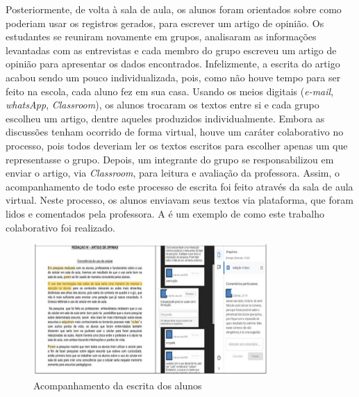 \documentclass{textolivre}
\begin{document}
Posteriormente, de volta à sala de aula, os alunos foram orientados sobre como poderiam usar os registros gerados, para escrever um artigo de opinião. Os estudantes se reuniram novamente em grupos, analisaram as informações levantadas com as entrevistas e cada membro do grupo escreveu um artigo de opinião para apresentar os dados encontrados. Infelizmente, a escrita do artigo acabou sendo um pouco individualizada, pois, como não houve tempo para ser feito na escola, cada aluno fez em sua casa. Usando os meios digitais (\emph{e-mail}, \emph{whatsApp}, \emph{Classroom}), os alunos trocaram os textos entre si e cada grupo escolheu um artigo, dentre aqueles produzidos individualmente. Embora as discussões tenham ocorrido de forma virtual, houve um caráter colaborativo no processo, pois todos deveriam ler os textos escritos para escolher apenas um que representasse o grupo. Depois, um integrante do grupo se responsabilizou em enviar o artigo, via \emph{Classroom}, para leitura e avaliação da professora. Assim, o acompanhamento de todo este processo de escrita foi feito através da sala de aula virtual. Neste processo, os alunos enviavam seus textos via plataforma, que foram lidos e comentados pela professora. A  é um exemplo de como este trabalho colaborativo foi realizado.

\begin{figure}[htbp]
    \centering
    \includegraphics[width=0.8\textwidth]{figure01.png}
    \caption{Acompanhamento da escrita dos alunos}
    \label{fig01}
\end{figure}
\end{document}
